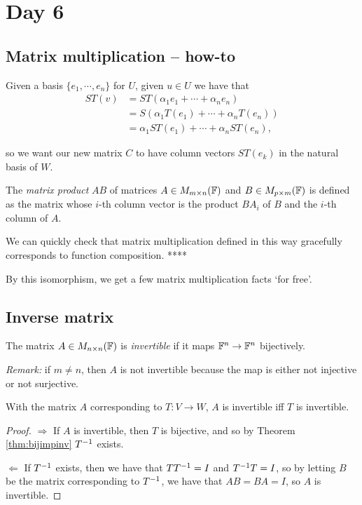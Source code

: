 
\pagebreak
\section{Day 6}

\subsection{Matrix multiplication -- how-to}

Given a basis $\{e_1,\cdots,e_n\}$ for $U$, given $u\in U$ we have that
\begin{align*}
  ST(v) &= ST(\alpha_1 e_1 + \cdots + \alpha_n e_n)\\
  &= S(\alpha_1 T(e_1) + \cdots + \alpha_n T(e_n))\\
  &= \alpha_1 ST(e_1) + \cdots + \alpha_n ST(e_n),
\end{align*}

so we want our new matrix $C$ to have column vectors $ST(e_k)$ in the natural basis of $W$.

\begin{definition}
  The \emph{matrix product} $AB$ of matrices $A\in M_{m\times n}(\mathbb{F})$ and $B\in M_{p\times m}(\mathbb{F})$ is defined as the matrix whose $i$-th column vector is the product $BA_i$ of $B$ and the $i$-th column of $A$.
\end{definition}

We can quickly check that matrix multiplication defined in this way gracefully corresponds to function composition. ****

By this isomorphism, we get a few matrix multiplication facts `for free'.

\subsection{Inverse matrix}

\begin{definition}
  The matrix $A\in M_{n\times n}(\mathbb{F})$ is \emph{invertible} if it maps $\mathbb{F}^n\to\mathbb{F}^n$ bijectively.
\end{definition}

\emph{Remark:} if $m\neq n$, then $A$ is not invertible because the map is either not injective or not surjective.

\begin{proposition}
  With the matrix $A$ corresponding to $T:V\to W$, $A$ is invertible iff $T$ is invertible.
\end{proposition}
\begin{proof}
  $\Longrightarrow$ If $A$ is invertible, then $T$ is bijective, and so by Theorem \ref{thm:bijimpinv} $T^{-1}$ exists.

  $\Longleftarrow$ If $T^{-1}$ exists, then we have that $TT^{-1}= I$ and $T^{-1} T=I$, so by letting $B$ be the matrix corresponding to $T^{-1}$, we have that $AB=BA=I$, so $A$ is invertible.
\end{proof}

